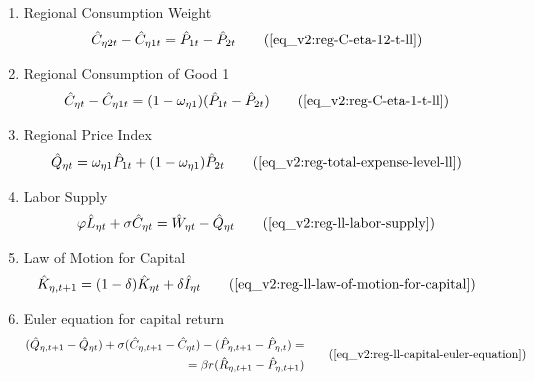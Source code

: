 \documentclass[../thesis.tex]{subfiles}
\begin{document}
{\begin{itemize}
\begin{enumerate}
			\item Regional Consumption Weight
			\begin{align}
				\hat{C}_{\eta 2t} - \hat{C}_{\eta 1t} &= \hat{P}_{1t} - \hat{P}_{2t} \tag{\ref{eq_v2:reg-C-eta-12-t-ll}}
			\end{align}
			
			\item Regional Consumption of Good 1
			\begin{align}
				\hat{C}_{\eta t} - \hat{C}_{\eta 1 t} &= (1 - \omega_{\eta 1}) (\hat{P}_{1t} - \hat{P}_{2t}) \tag{\ref{eq_v2:reg-C-eta-1-t-ll}}
			\end{align}
			
			\item Regional Price Index
			\begin{align}
				\hat{Q}_{\eta t} &= \omega_{\eta 1} \hat{P}_{1 t} + (1 -\omega_{\eta 1}) \hat{P}_{2 t} \tag{\ref{eq_v2:reg-total-expense-level-ll}}
			\end{align}
			
			\item Labor Supply
			\begin{alignat}{2}
				\varphi \hat{L}_{\eta t} + \sigma \hat{C}_{\eta t} &= \hat{W}_{\eta t} - \hat{Q}_{\eta t} \tag{\ref{eq_v2:reg-ll-labor-supply}}
			\end{alignat}
			
			\item Law of Motion for Capital
			\begin{align}
				\hat{K}_{\eta, t+1} &= (1-\delta) \hat{K}_{\eta t} + \delta \hat{I}_{\eta t} \tag{\ref{eq_v2:reg-ll-law-of-motion-for-capital}}
			\end{align}
			
			\item Euler equation for capital return
			\begin{align}
				\begin{split}
					(\hat{Q}_{\eta, t+1} - \hat{Q}_{\eta t}) + \sigma(\hat{C}_{\eta, t+1} - \hat{C}_{\eta t}) - (\hat{P}_{\eta, t+1} - \hat{P}_{\eta, t}) = \\
					\qquad = \beta r_{}(\hat{R}_{\eta, t+1} - \hat{P}_{\eta, t+1})
				\end{split} \tag{\ref{eq_v2:reg-ll-capital-euler-equation}}
			\end{align}
			
			
			\begin{comment}
				\item Region 1 Euler equation for the bonds return
				\begin{align}
					\hat{Q}_{1, t+1} - \hat{Q}_{1t} + \sigma (\hat{C}_{1, t+1} - \hat{C}_{1t}) &= (1 - \beta) \hat{R}_{t} \tag{\ref{eq_v2:reg-bonds-euler-equation-ll}}
				\end{align}
				

\end{comment}
\end{enumerate}
\end{itemize}}
\end{document}
